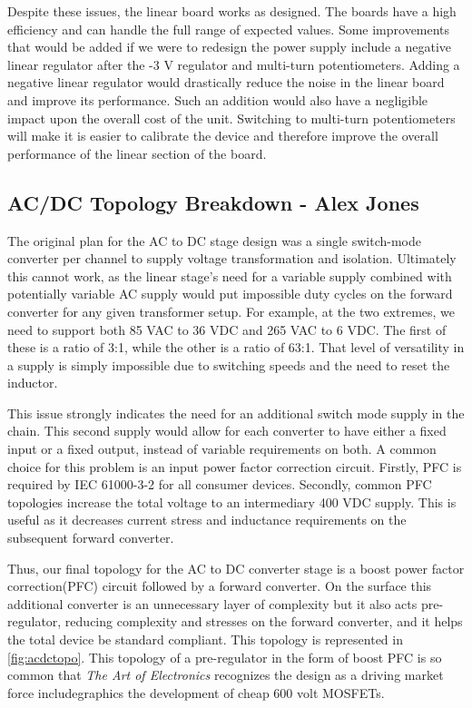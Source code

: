 \documentclass[15pt]{article}
\begin{document}
Despite these issues, the linear board works as designed. The boards have a high efficiency and can handle the full range of expected values. Some improvements that would be added if we were to redesign the power supply include a negative linear regulator after the -3 V regulator and multi-turn potentiometers. Adding a negative linear regulator would drastically reduce the noise in the linear board and improve its performance. Such an addition would also have a negligible impact upon the overall cost of the unit. Switching to multi-turn potentiometers will make it is easier to calibrate the device and therefore improve the overall performance of the linear section of the board.


\pagebreak
\subsection{AC/DC Topology Breakdown - Alex Jones}
The original plan for the AC to DC stage design was a single switch-mode converter per channel to supply voltage transformation and isolation. Ultimately this cannot work, as the linear stage’s need for a variable supply combined with potentially variable AC supply would put impossible duty cycles on the forward converter for any given transformer setup. For example, at the two extremes, we need to support both 85 VAC to 36 VDC and 265 VAC to 6 VDC. The first of these is a ratio of 3:1, while the other is a ratio of 63:1. That level of versatility in a supply is simply impossible due to switching speeds and the need to reset the inductor.

This issue strongly indicates the need for an additional switch mode supply in the chain. This second supply would allow for each converter to have either a fixed input or a fixed output, instead of variable requirements on both. A common choice for this problem is an input power factor correction circuit. Firstly, PFC is required by IEC 61000-3-2 for all consumer devices. Secondly, common PFC topologies increase the total voltage to an intermediary 400 VDC supply. This is useful as it decreases current stress and inductance requirements on the subsequent forward converter.

Thus, our final topology for the AC to DC converter stage is a boost power factor correction(PFC) circuit followed by a forward converter. On the surface this additional converter is an unnecessary layer of complexity but it also acts pre-regulator, reducing complexity and stresses on the forward converter, and it helps the total device be standard compliant.  This topology is represented in \autoref{fig:acdctopo}. This topology of a pre-regulator in the form of boost PFC is so common that \emph{The Art of Electronics}\cite{aoe} recognizes the design as a driving market force includegraphics the development of cheap 600 volt MOSFETs.
\end{document}
